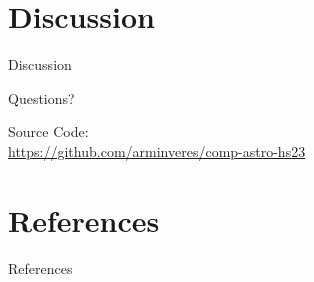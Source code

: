 \documentclass[
	9pt, %
]{beamer}
\begin{document}
\section{Discussion}
\begin{frame}[plain] %
	\begin{center}
		{\Huge Discussion}\bigskip\bigskip

		{\LARGE Questions?}\bigskip\bigskip

		Source Code: \\
		\url{https://github.com/arminveres/comp-astro-hs23}
	\end{center}
\end{frame}

\section{References}
\begin{frame}[allowframebreaks]{References}
	
	
	\nocite{*}
\end{frame}
\end{document}
